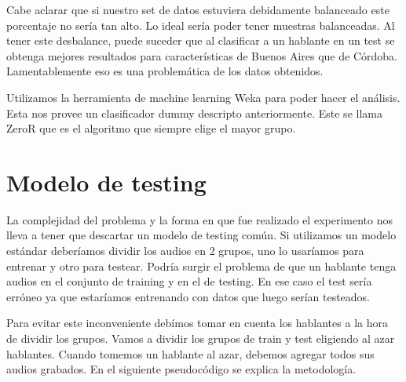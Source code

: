 \documentclass[11pt,a4paper,twoside]{tesis}
\begin{document}


Cabe aclarar que si nuestro set de datos estuviera debidamente balanceado este porcentaje no sería tan alto. Lo ideal sería poder tener muestras balanceadas. Al tener este desbalance, puede suceder que al clasificar a un hablante en un test se obtenga mejores resultados para características de Buenos Aires que de Córdoba. Lamentablemente eso es una problemática de los datos obtenidos.

Utilizamos la herramienta de machine learning Weka para poder hacer el análisis. Esta nos provee un clasificador dummy descripto anteriormente. Este se llama ZeroR que es el algoritmo que siempre elige el mayor grupo.

\section{Modelo de testing}

La complejidad del problema y la forma en que fue realizado el experimento nos lleva a tener que descartar un modelo de testing común. Si utilizamos un modelo estándar deberíamos dividir los audios en 2 grupos, uno lo usaríamos para entrenar y otro para testear. Podría surgir el problema de que un hablante tenga audios en el conjunto de training y en el de testing. En ese caso el test sería erróneo ya que estaríamos entrenando con datos que luego serían testeados.

Para evitar este inconveniente debímos tomar en cuenta los hablantes a la hora de dividir los grupos. Vamos a dividir los grupos de train y test eligiendo al azar hablantes. Cuando tomemos un hablante al azar, debemos agregar todos sus audios grabados. En el siguiente pseudocódigo se explica la metodología. 
\end{document}

